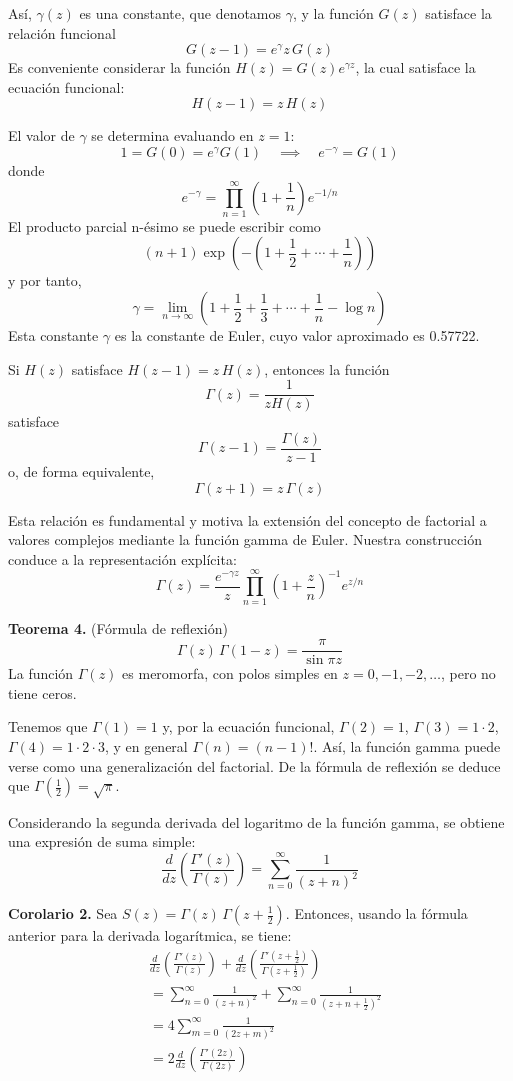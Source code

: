\documentclass{article}
\theoremstyle{nonumberplain}
\begin{document}
Así, \( \gamma(z) \) es una constante, que denotamos \( \gamma \), y la función \( G(z) \) satisface la relación funcional
\[
G(z-1) = e^{\gamma} z\, G(z)
\]
Es conveniente considerar la función \( H(z) = G(z) e^{\gamma z} \), la cual satisface la ecuación funcional:
\[
H(z-1) = z\, H(z)
\]

El valor de \( \gamma \) se determina evaluando en \( z=1 \):
\[
1 = G(0) = e^{\gamma} G(1) \quad \implies \quad e^{-\gamma} = G(1)
\]
donde
\[
e^{-\gamma} = \prod_{n=1}^{\infty} \left(1 + \frac{1}{n}\right) e^{-1/n}
\]
El producto parcial n-ésimo se puede escribir como
\[
(n+1) \exp\left( -\left(1 + \frac{1}{2} + \cdots + \frac{1}{n} \right) \right)
\]
y por tanto,
\[
\gamma = \lim_{n \to \infty} \left( 1 + \frac{1}{2} + \frac{1}{3} + \cdots + \frac{1}{n} - \log n \right)
\]
Esta constante \( \gamma \) es la constante de Euler, cuyo valor aproximado es 0.57722.

Si \( H(z) \) satisface \( H(z-1) = z\, H(z) \), entonces la función
\[
\Gamma(z) = \frac{1}{z H(z)}
\]
satisface
\[
\Gamma(z-1) = \frac{\Gamma(z)}{z-1}
\]
o, de forma equivalente,
\[
\Gamma(z+1) = z\, \Gamma(z)
\]

Esta relación es fundamental y motiva la extensión del concepto de factorial a valores complejos mediante la función gamma de Euler. Nuestra construcción conduce a la representación explícita:
\[
\Gamma(z) = \frac{e^{-\gamma z}}{z} \prod_{n=1}^{\infty} \left(1 + \frac{z}{n} \right)^{-1} e^{z/n}
\]

\textbf{Teorema 4.} (Fórmula de reflexión)
\[
\Gamma(z)\, \Gamma(1-z) = \frac{\pi}{\sin \pi z}
\]
La función \( \Gamma(z) \) es meromorfa, con polos simples en \( z=0, -1, -2, \ldots \), pero no tiene ceros.

Tenemos que \( \Gamma(1) = 1 \) y, por la ecuación funcional, \( \Gamma(2) = 1 \), \( \Gamma(3) = 1 \cdot 2 \), \( \Gamma(4) = 1 \cdot 2 \cdot 3 \), y en general \( \Gamma(n) = (n-1)! \). Así, la función gamma puede verse como una generalización del factorial. De la fórmula de reflexión se deduce que \( \Gamma\left( \frac{1}{2} \right) = \sqrt{\pi} \).

Considerando la segunda derivada del logaritmo de la función gamma, se obtiene una expresión de suma simple:
\[
\frac{d}{dz} \left( \frac{\Gamma'(z)}{\Gamma(z)} \right) = \sum_{n=0}^{\infty} \frac{1}{(z+n)^2}
\]

\textbf{Corolario 2.} Sea \( S(z) = \Gamma(z)\, \Gamma\left(z+\frac{1}{2}\right) \). Entonces, usando la fórmula anterior para la derivada logarítmica, se tiene:
\[
\begin{aligned}
&\frac{d}{dz}\left( \frac{\Gamma'(z)}{\Gamma(z)} \right) + \frac{d}{dz}\left( \frac{\Gamma'(z+\frac{1}{2})}{\Gamma(z+\frac{1}{2})} \right) \\
&= \sum_{n=0}^{\infty} \frac{1}{(z+n)^2} + \sum_{n=0}^{\infty} \frac{1}{(z+n+\frac{1}{2})^2} \\
&= 4 \sum_{m=0}^{\infty} \frac{1}{(2z+m)^2} \\
&= 2 \frac{d}{dz} \left( \frac{\Gamma'(2z)}{\Gamma(2z)} \right)
\end{aligned}
\]
\end{document}
